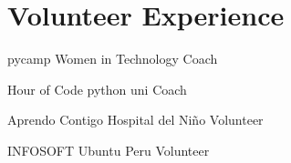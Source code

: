 \section{Volunteer Experience}

{pycamp}
{Women in Technology}
{Coach}{}
{}  

{Hour of Code}
{python uni}
{Coach}{}
{}  

{Aprendo Contigo}
{Hospital del Niño}
{Volunteer}{}
{}  

{INFOSOFT}
{Ubuntu Peru}
{Volunteer}{}
{}  